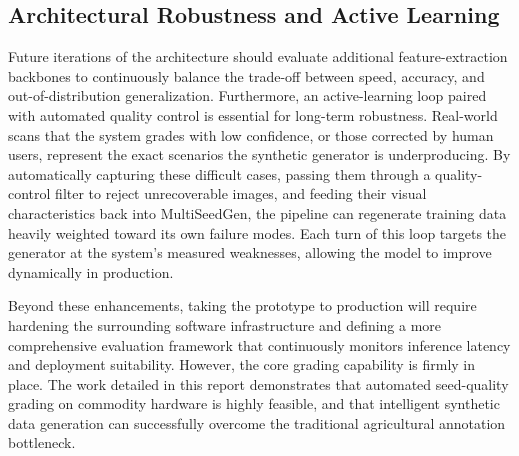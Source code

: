 \subsection{Architectural Robustness and Active Learning}
Future iterations of the architecture should evaluate additional feature-extraction backbones to continuously balance the trade-off between speed, accuracy, and out-of-distribution generalization. Furthermore, an active-learning loop paired with automated quality control is essential for long-term robustness. Real-world scans that the system grades with low confidence, or those corrected by human users, represent the exact scenarios the synthetic generator is underproducing. By automatically capturing these difficult cases, passing them through a quality-control filter to reject unrecoverable images, and feeding their visual characteristics back into MultiSeedGen, the pipeline can regenerate training data heavily weighted toward its own failure modes. Each turn of this loop targets the generator at the system's measured weaknesses, allowing the model to improve dynamically in production.

\vspace{1em}

Beyond these enhancements, taking the prototype to production will require hardening the surrounding software infrastructure and defining a more comprehensive evaluation framework that continuously monitors inference latency and deployment suitability. However, the core grading capability is firmly in place. The work detailed in this report demonstrates that automated seed-quality grading on commodity hardware is highly feasible, and that intelligent synthetic data generation can successfully overcome the traditional agricultural annotation bottleneck.